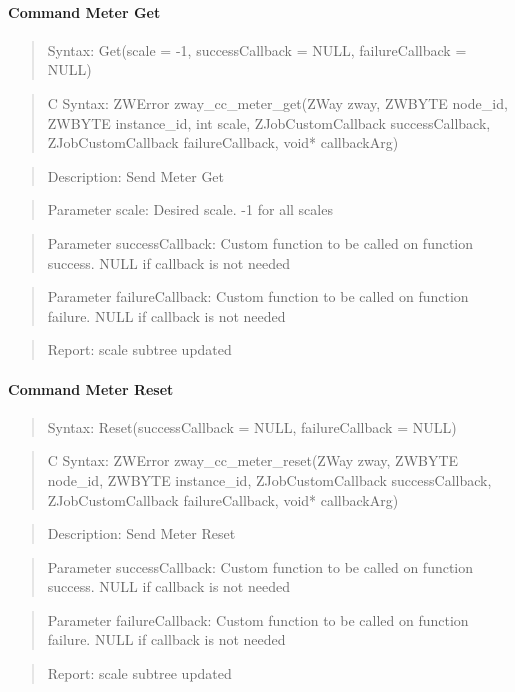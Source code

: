 \paragraph{Command Meter Get}
\begin{quote}Syntax: Get(scale = -1, successCallback = NULL, failureCallback = NULL)\end{quote}
\begin{quote}C Syntax: ZWError zway\_cc\_meter\_get(ZWay zway, ZWBYTE node\_id, ZWBYTE instance\_id, int scale, ZJobCustomCallback successCallback, ZJobCustomCallback failureCallback, void* callbackArg)\end{quote}
\begin{quote}Description: Send Meter Get\end{quote}
\begin{quote}Parameter scale: Desired scale. -1 for all scales\end{quote}
\begin{quote}Parameter successCallback: Custom function to be called on function success. NULL if callback is not needed\end{quote}
\begin{quote}Parameter failureCallback: Custom function to be called on function failure. NULL if callback is not needed\end{quote}
\begin{quote}Report: scale subtree updated\end{quote}

\paragraph{Command Meter Reset}
\begin{quote}Syntax: Reset(successCallback = NULL, failureCallback = NULL)\end{quote}
\begin{quote}C Syntax: ZWError zway\_cc\_meter\_reset(ZWay zway, ZWBYTE node\_id, ZWBYTE instance\_id, ZJobCustomCallback successCallback, ZJobCustomCallback failureCallback, void* callbackArg)\end{quote}
\begin{quote}Description: Send Meter Reset\end{quote}
\begin{quote}Parameter successCallback: Custom function to be called on function success. NULL if callback is not needed\end{quote}
\begin{quote}Parameter failureCallback: Custom function to be called on function failure. NULL if callback is not needed\end{quote}
\begin{quote}Report: scale subtree updated\end{quote}

